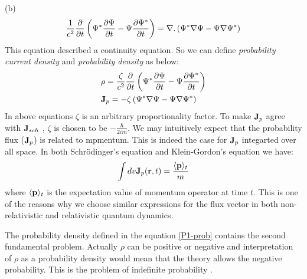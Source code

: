 \begin{homeworkProblem}
\begin{homeworkSection}{(b)}
\begin{equation}
\frac{1}{c^2}\dfrac{\partial}{\partial t}\left(\Psi^*\dfrac{\partial \Psi}{\partial t}-\Psi\dfrac{\partial \Psi^*}{\partial t}\right)=\nabla.\left(\Psi^*\nabla\Psi-\Psi\nabla\Psi^*\right)
\end{equation}
This equation described a continuity equation. So we can define \textit{probability current density} and \textit{probability density} as below:
\begin{align}
&\rho=\frac{\zeta}{c^2}\frac{\partial}{\partial t}\left(\Psi^*\dfrac{\partial \Psi}{\partial t}-\Psi\dfrac{\partial \Psi^*}{\partial t}\right)\label{P1-prob}\\
&\mathbf{J}_{p}=-\zeta\left(\Psi^*\nabla\Psi-\Psi\nabla\Psi^*\right)\label{P1-J}
\end{align}
In above equations $\zeta$ is an arbitrary proportionality factor. To make $\mathbf{J}_{p}$ agree with $\mathbf{J}_{sch}$ , $\zeta$ is chosen to be $-\frac{\hbar}{2im}$. We may intuitively expect that the probability flux ($\mathbf{J}_p$) is related to mpmentum. This is indeed the case for $\mathbf{J}_p$ integarted over all space. In both Schr\"odinger's equation and Klein-Gordon's equation we have:
\begin{equation}\label{P1-ex}
\int dv\mathbf{J}_{p}(\mathbf{r},t)=\frac{\langle \mathbf{p}\rangle_t}{m}
\end{equation}
where $\langle \mathbf{p}\rangle_t$ is the expectation value of momentum operator at time $t$. This is one of the reasons why we choose similar expressions for the flux vector in both non-relativistic and relativistic quantum dynamics. 

 The probability density  defined in the equation 
\eqref{P1-prob} contains the second fundamental problem. Actually $\rho$ can be positive or negative and interpretation of $\rho$ as a probability density would mean that the theory allows the negative probability. This is the problem of indefinite probability \cite{greiner-relativistic_QM}.    



\end{homeworkSection}

\end{homeworkProblem}